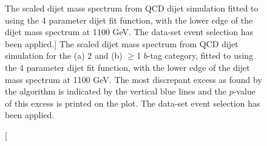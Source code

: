 \begin{figure}[!ht]
  \begin{center}
   \captionsetup[subfigure]{aboveskip=0pt,justification=centering}
  \end{center}
  \vspace{-1em}
  \caption
      [The scaled dijet mass spectrum from QCD dijet simulation
        fitted to using the 4 parameter dijet fit function, with the lower edge of the dijet mass spectrum at 1100 GeV.
        The \summer{} data-set event selection has been applied.]
      {The scaled dijet mass spectrum from QCD dijet simulation for the (a) 2 and (b) $\geq$1 $b$-tag category,
        fitted to using the 4 parameter dijet fit function, with the lower edge of the dijet mass spectrum at 1100 GeV.
        The most discrepant excess as found by the \bh{} algorithm is indicated by the vertical blue lines and the \mbox{$p$-value} of this excess is printed on the plot.         
        The \summer{} data-set event selection has been applied.}
 \label{fig:Short_4para_1100_figure1}
\end{figure}
%
%
